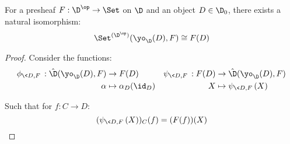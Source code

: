 \begin{theorem}
  For a presheaf $F: \D^\op \to \Set$ on $\D$ and an object $D\in \D_0$, there
  exists a natural isomorphism:
  \[\Set^{(\D^\op)}(\yo_\D(D), F) \cong F(D)\]

  \begin{proof}
    Consider the functions:
    \[
      \begin{gathered}
        \begin{aligned}
          \phi_{\< D, F\>}: \hat{\D}(\yo_\D(D), F) &\to F(D)\\
          \alpha &\mapsto \alpha_D(\id_D)
        \end{aligned}\quad
        \begin{aligned}
          \psi_{\<D, F\>}: F(D) &\to \hat{\D}(\yo_\D(D), F)\\
          X &\mapsto \psi_{\<D, F\>}(X)
        \end{aligned}
      \end{gathered}
    \]

    Such that for $f:C\to D$:
    \[(\psi_{\<D, F\>}(X))_{C}(f) = (F(f))(X)\]


\end{proof}
\end{theorem}
